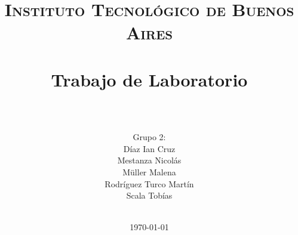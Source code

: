 









\title{
	\normalfont \normalsize \textsc{Instituto Tecnológico de Buenos Aires} \\ [25pt]
	\horrule{2pt} \\[0.4cm]
	\huge Trabajo de Laboratorio \\
	\horrule{2pt} \\[0cm]
\author{Grupo 2:\\Díaz Ian Cruz\\Mestanza Nicol\'as\\ Müller Malena\\Rodr\'iguez Turco Mart\'in\\ Scala Tob\'ias\\ \\ }
}
\date{\today} %

\maketitle
\newpage




%
%
%
%



